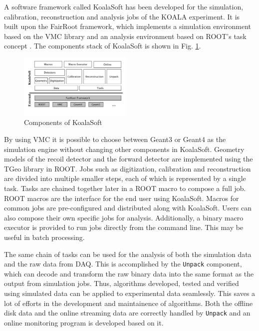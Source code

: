 \documentclass[number,5p]{elsarticle}
\begin{document}
A software framework called KoalaSoft has been developed for the simulation, calibration, reconstruction and analysis jobs of the KOALA experiment.
It is built upon the FairRoot \cite{fairroot} framework, which implements a
simulation environment based on the VMC \cite{vmc} library and an analysis
environment based on ROOT's task concept \cite{root}.
The components stack of KoalaSoft is shown in Fig. \ref{fig:koalasoft}.

\begin{figure}[htbp]
  \centering
  \includegraphics[width=0.48\textwidth]{./koalasoft_components.png}
  \caption{Components of KoalaSoft}
  \label{fig:koalasoft}
\end{figure}

By using VMC it is possible to choose between Geant3 or Geant4 as the simulation engine without changing other components in KoalaSoft.
Geometry models of the recoil detector and the forward detector are implemented
using the TGeo library in ROOT.
Jobs such as digitization, calibration and reconstruction are divided into multiple smaller steps, each of which is represented by a single task.
Tasks are chained together later in a ROOT macro to compose a full job. 
ROOT macros are the interface for the end user using KoalaSoft.
Macros for common jobs are pre-configured and distributed along with KoalaSoft.
Users can also compose their own specific jobs for analysis.
Additionally, a binary macro executor is provided to run jobs directly from the command line. This may be useful in batch processing.

The same chain of tasks can be used for the analysis of both the simulation data and the raw data from DAQ.
This is accomplished by the \texttt{Unpack} component, which can decode and transform the raw binary data into the same format as the output from simulation jobs.
Thus, algorithms developed, tested and verified using simulated data can be applied to experimental data seamlessly.
This saves a lot of efforts in the development and maintainence of algorithms.
Both the offline disk data and the online streaming data are correctly handled by \texttt{Unpack} and an online monitoring program is developed based on it.
\end{document}
